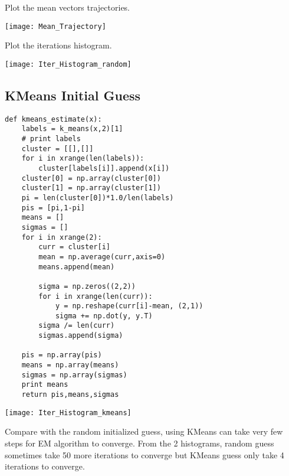 \documentclass[a4paper]{article}
\begin{document}
Plot the mean vectors trajectories. \\
\begin{center}
	\texttt{[image: Mean\_Trajectory]}
\end{center}
Plot the iterations histogram. \\
\begin{center}
	\texttt{[image: Iter\_Histogram\_random]}
\end{center}
\subsection*{KMeans Initial Guess}
\begin{lstlisting}
def kmeans_estimate(x):
    labels = k_means(x,2)[1]
    # print labels
    cluster = [[],[]]
    for i in xrange(len(labels)):
        cluster[labels[i]].append(x[i])
    cluster[0] = np.array(cluster[0])
    cluster[1] = np.array(cluster[1])
    pi = len(cluster[0])*1.0/len(labels)
    pis = [pi,1-pi]
    means = []
    sigmas = []
    for i in xrange(2):
        curr = cluster[i]
        mean = np.average(curr,axis=0)
        means.append(mean)

        sigma = np.zeros((2,2))
        for i in xrange(len(curr)):
            y = np.reshape(curr[i]-mean, (2,1))
            sigma += np.dot(y, y.T)
        sigma /= len(curr)
        sigmas.append(sigma)

    pis = np.array(pis)
    means = np.array(means)
    sigmas = np.array(sigmas)
    print means
    return pis,means,sigmas
\end{lstlisting}
\begin{center}
	\texttt{[image: Iter\_Histogram\_kmeans]}
\end{center}
Compare with the random initialized guess, using KMeans can take very few steps for EM algorithm to converge. From the 2 histograms, random guess sometimes take 50 more iterations to converge but KMeans guess only take 4 iterations to converge. 
\end{document}
